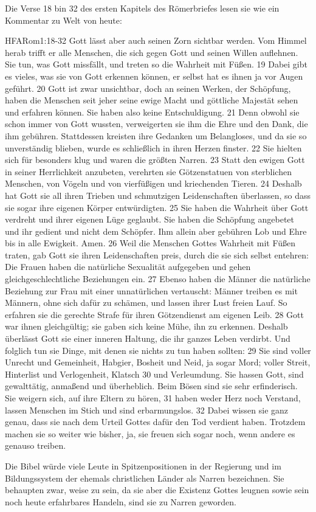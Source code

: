 \documentclass{../inc/mybibbook}
\begin{document}
Die Verse 18 bin 32 des ersten Kapitels des Römerbriefes lesen sie wie ein Kommentar zu Welt von heute:
\begin{bibeltext}{HFA}{Rom}{1:18-32}
    Gott lässt aber auch seinen Zorn sichtbar werden. Vom Himmel herab trifft er alle Menschen, die sich gegen Gott und seinen Willen auflehnen. Sie tun, was Gott missfällt, und treten so die Wahrheit mit Füßen. 19 Dabei gibt es vieles, was sie von Gott erkennen können, er selbst hat es ihnen ja vor Augen geführt. 20 Gott ist zwar unsichtbar, doch an seinen Werken, der Schöpfung, haben die Menschen seit jeher seine ewige Macht und göttliche Majestät sehen und erfahren können. Sie haben also keine Entschuldigung. 21 Denn obwohl sie schon immer von Gott wussten, verweigerten sie ihm die Ehre und den Dank, die ihm gebühren. Stattdessen kreisten ihre Gedanken um Belangloses, und da sie so unverständig blieben, wurde es schließlich in ihren Herzen finster. 22 Sie hielten sich für besonders klug und waren die größten Narren. 23 Statt den ewigen Gott in seiner Herrlichkeit anzubeten, verehrten sie Götzenstatuen von sterblichen Menschen, von Vögeln und von vierfüßigen und kriechenden Tieren. 24 Deshalb hat Gott sie all ihren Trieben und schmutzigen Leidenschaften überlassen, so dass sie sogar ihre eigenen Körper entwürdigten. 25 Sie haben die Wahrheit über Gott verdreht und ihrer eigenen Lüge geglaubt. Sie haben die Schöpfung angebetet und ihr gedient und nicht dem Schöpfer. Ihm allein aber gebühren Lob und Ehre bis in alle Ewigkeit. Amen. 26 Weil die Menschen Gottes Wahrheit mit Füßen traten, gab Gott sie ihren Leidenschaften preis, durch die sie sich selbst entehren: Die Frauen haben die natürliche Sexualität aufgegeben und gehen gleichgeschlechtliche Beziehungen ein. 27 Ebenso haben die Männer die natürliche Beziehung zur Frau mit einer unnatürlichen vertauscht: Männer treiben es mit Männern, ohne sich dafür zu schämen, und lassen ihrer Lust freien Lauf. So erfahren sie die gerechte Strafe für ihren Götzendienst am eigenen Leib. 28 Gott war ihnen gleichgültig; sie gaben sich keine Mühe, ihn zu erkennen. Deshalb überlässt Gott sie einer inneren Haltung, die ihr ganzes Leben verdirbt. Und folglich tun sie Dinge, mit denen sie nichts zu tun haben sollten: 29 Sie sind voller Unrecht und Gemeinheit, Habgier, Bosheit und Neid, ja sogar Mord; voller Streit, Hinterlist und Verlogenheit, Klatsch 30 und Verleumdung. Sie hassen Gott, sind gewalttätig, anmaßend und überheblich. Beim Bösen sind sie sehr erfinderisch. Sie weigern sich, auf ihre Eltern zu hören, 31 haben weder Herz noch Verstand, lassen Menschen im Stich und sind erbarmungslos. 32 Dabei wissen sie ganz genau, dass sie nach dem Urteil Gottes dafür den Tod verdient haben. Trotzdem machen sie so weiter wie bisher, ja, sie freuen sich sogar noch, wenn andere es genauso treiben.
\end{bibeltext}
Die Bibel würde viele Leute in Spitzenpositionen in der Regierung und im Bildungssystem der ehemals christlichen Länder als \flqq Narren\frqq{} bezeichnen. Sie behaupten zwar, weise zu sein, da sie aber die Existenz Gottes leugnen sowie sein noch heute erfahrbares Handeln, \flqq sind sie zu Narren geworden\frqq.
\end{document}
